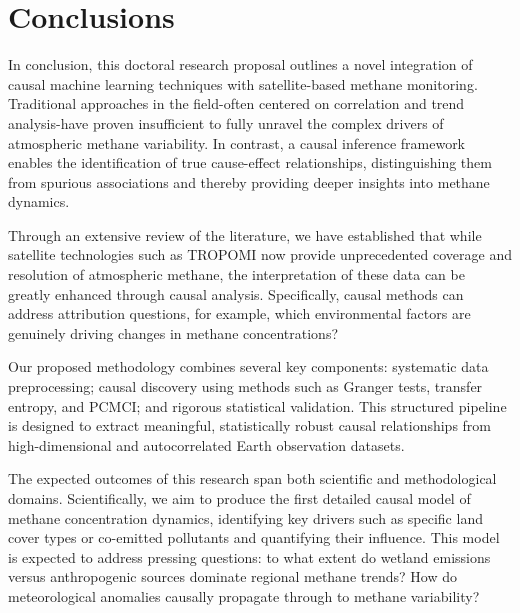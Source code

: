 \label{chap:conclusion}
\cleardoublepage

\section{Conclusions}

In conclusion, this doctoral research proposal outlines a novel integration of causal machine learning techniques with satellite-based methane monitoring. Traditional approaches in the field-often centered on correlation and trend analysis-have proven insufficient to fully unravel the complex drivers of atmospheric methane variability. In contrast, a causal inference framework enables the identification of true cause-effect relationships, distinguishing them from spurious associations and thereby providing deeper insights into methane dynamics.

Through an extensive review of the literature, we have established that while satellite technologies such as TROPOMI now provide unprecedented coverage and resolution of atmospheric methane, the interpretation of these data can be greatly enhanced through causal analysis. Specifically, causal methods can address attribution questions, for example, which environmental factors are genuinely driving changes in methane concentrations?

Our proposed methodology combines several key components: systematic data preprocessing; causal discovery using methods such as Granger tests, transfer entropy, and PCMCI; and rigorous statistical validation. This structured pipeline is designed to extract meaningful, statistically robust causal relationships from high-dimensional and autocorrelated Earth observation datasets.

The expected outcomes of this research span both scientific and methodological domains. Scientifically, we aim to produce the first detailed causal model of methane concentration dynamics, identifying key drivers such as specific land cover types or co-emitted pollutants and quantifying their influence. This model is expected to address pressing questions: to what extent do wetland emissions versus anthropogenic sources dominate regional methane trends? How do meteorological anomalies causally propagate through to methane variability?

